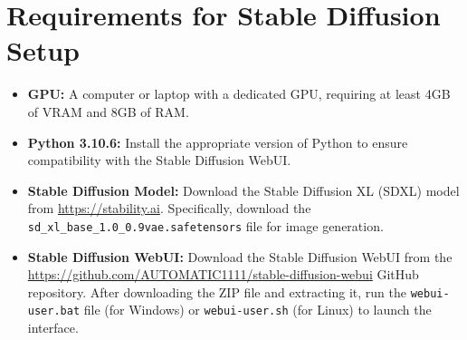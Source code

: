 \documentclass[12pt,DIV14,BCOR12mm,a4paper,footinclude=false,headinclude,parskip=half-,twoside,openright,cleardoublepage=empty,toc=index,bibliography=totoc,listof=totoc]{scrreprt}
\def \doclang{english} 	%
\numberwithin{equation}{chapter}
\begin{document}
\section{Requirements for Stable Diffusion Setup}
\label{appendix:stable_diffusion}
\begin{itemize}
    \item \textbf{GPU:} A computer or laptop with a dedicated GPU, requiring at least 4GB of VRAM and 8GB of RAM.
    \item \textbf{Python 3.10.6:} Install the appropriate version of Python to ensure compatibility with the Stable Diffusion WebUI.
    \item \textbf{Stable Diffusion Model:} Download the Stable Diffusion XL (SDXL) model from \url{https://stability.ai}. Specifically, download the \texttt{sd\_xl\_base\_1.0\_0.9vae.safetensors} file for image generation.
    \item \textbf{Stable Diffusion WebUI:} Download the Stable Diffusion WebUI from the \url{https://github.com/AUTOMATIC1111/stable-diffusion-webui} GitHub repository. After downloading the ZIP file and extracting it, run the \texttt{webui-user.bat} file (for Windows) or \texttt{webui-user.sh} (for Linux) to launch the interface.
\end{itemize}








\listoffigures
\listoftables

\ifthenelse{\equal{\doclang}{german}}{
	
}{
	
}

\end{document}
